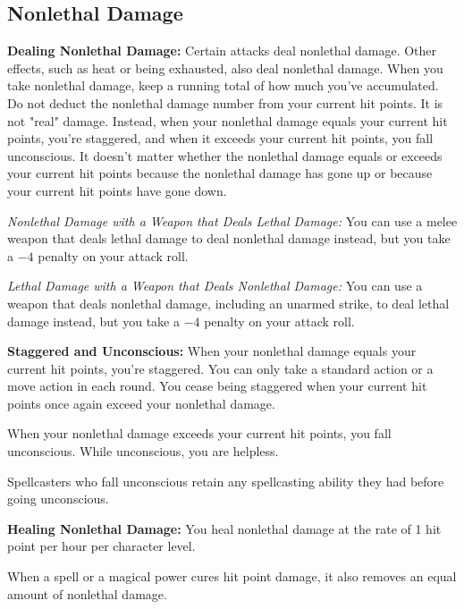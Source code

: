 \subsection{Nonlethal Damage}
\textbf{Dealing Nonlethal Damage:} Certain attacks deal nonlethal damage. Other effects, such as heat or being exhausted, also deal nonlethal damage. When you take nonlethal damage, keep a running total of how much you've accumulated. Do not deduct the nonlethal damage number from your current hit points. It is not "real" damage. Instead, when your nonlethal damage equals your current hit points, you're staggered, and when it exceeds your current hit points, you fall unconscious. It doesn't matter whether the nonlethal damage equals or exceeds your current hit points because the nonlethal damage has gone up or because your current hit points have gone down.

\textit{Nonlethal Damage with a Weapon that Deals Lethal Damage:} You can use a melee weapon that deals lethal damage to deal nonlethal damage instead, but you take a $-4$ penalty on your attack roll.

\textit{Lethal Damage with a Weapon that Deals Nonlethal Damage:} You can use a weapon that deals nonlethal damage, including an unarmed strike, to deal lethal damage instead, but you take a $-4$ penalty on your attack roll.

\textbf{Staggered and Unconscious:} When your nonlethal damage equals your current hit points, you're staggered. You can only take a standard action or a move action in each round. You cease being staggered when your current hit points once again exceed your nonlethal damage.

When your nonlethal damage exceeds your current hit points, you fall unconscious. While unconscious, you are helpless.

Spellcasters who fall unconscious retain any spellcasting ability they had before going unconscious.

\textbf{Healing Nonlethal Damage:} You heal nonlethal damage at the rate of 1 hit point per hour per character level.

When a spell or a magical power cures hit point damage, it also removes an equal amount of nonlethal damage.

